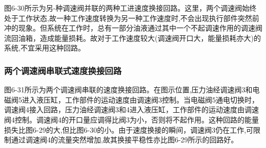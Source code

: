 图6-30所示为另-种调速阀并联的两种工进速度换接回路。这里，两个调速阀始终处于工作状态,故一种工作速度转换为另一种工作速度时,不会出现执行部件突然前冲的现象。但系统在工作时，总有一部分油液通过其中一个不起调速作用的调速阀流回油箱，造成能量损耗。故对于工作速度较大(调速阀开口大，能量损耗亦大)的系统,不宜采用这种回路。

\subsubsection{两个调速阀串联式速度换接回路}

图6-31所示为两个调速阀串联的速度换接回路。在图示位置,压力油经调速阀3和电磁阀5进入液压缸，工作部件的运动速度由调速阀3控制。当电磁阀5通电切换时，调速阀4接入回路，压力油经调速阀3和4进入液压缸，工作部件的运动速度由调速阀4控制。调速阀4的开口量应调得比阀3为小，否则将不起作用。这种回路的能量损失比图6-29的大,但比图6-30的小。由于速度换接的瞬间，调速阀3仍在工作,可限制通过调速阀4的流量突然增加,故其换接平稳性亦比图6-29所示的回路好。
